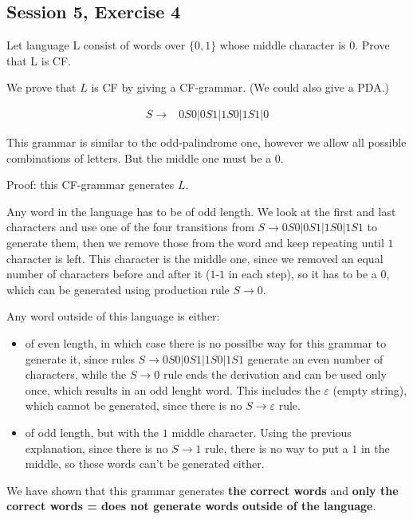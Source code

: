 \subsection {Session 5, Exercise 4}


Let language L consist of words over $\{0,1\}$ whose middle character is $0$. Prove that L is CF.


We prove that $L$ is CF by giving a CF-grammar. (We could also give a PDA.)

\begin{align*}
    S \rightarrow& 0S0 | 0S1 | 1S0 | 1S1 | 0
\end{align*}

This grammar is similar to the odd-palindrome one, however we allow all possible combinations of letters. But the middle one must be a $0$.

Proof: this CF-grammar generates $L$.

Any word in the language has to be of odd length. We look at the first and last characters and use one of the four transitions from $S \rightarrow 0S0 | 0S1 | 1S0 | 1S1$ to generate them, then we remove those from the word and keep repeating until $1$ character is left. This character is the middle one, since we removed an equal number of characters before and after it ($1$-$1$ in each step), so it has to be a $0$, which can be generated using production rule $S \rightarrow 0$.

Any word outside of this language is either:
\begin{itemize}
    \item of even length, in which case there is no possilbe way for this grammar to generate it, since rules  $S \rightarrow 0S0 | 0S1 | 1S0 | 1S1$ generate an even number of characters, while the  $S \rightarrow 0$ rule ends the derivation and can be used only once, which results in an odd lenght word. This includes the $\varepsilon$ (empty string), which cannot be generated, since there is no $S \rightarrow \varepsilon$ rule.
    \item of odd length, but with the $1$ middle character. Using the previous explanation, since there is no  $S \rightarrow 1$ rule, there is no way to put a $1$ in the middle, so these words can't be generated either.
\end{itemize}

We have shown that this grammar generates \textbf{the correct words} and \textbf{only the correct words = does not generate words outside of the language}.
